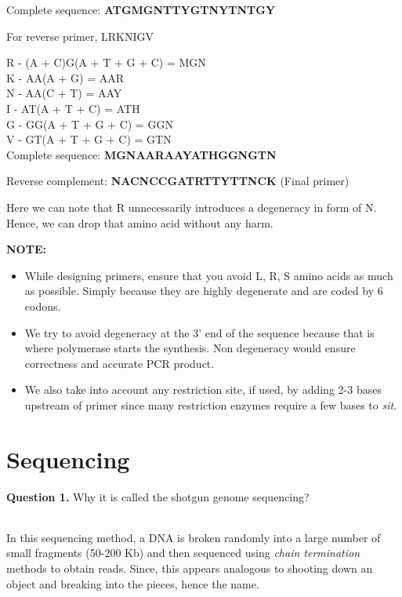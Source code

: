 \documentclass[12pt,a4paper]{report}
\begin{document}
\begin{enumerate}
Complete sequence: \textbf{ATGMGNTTYGTNYTNTGY}

For reverse primer, LRKNIGV

R - (A + C)G(A + T + G + C)  = MGN\\
K - AA(A + G)                = AAR\\
N - AA(C + T)                = AAY\\
I - AT(A + T + C)            = ATH\\
G - GG(A + T + G + C)        = GGN\\
V - GT(A + T + G + C)        = GTN\\

Complete sequence: \textbf{MGNAARAAYATHGGNGTN}

Reverse complement: \textbf{NACNCCGATRTTYTTNCK} (Final primer)

Here we can note that R unnecessarily introduces a degeneracy in form of N. 
Hence,
we can drop that amino acid without any harm.
\end{enumerate}

\textbf{NOTE:}
\begin{itemize}
\item While designing primers, ensure that you avoid L, R, S amino acids as 
much as
possible. Simply because they are highly degenerate and are coded by 6 codons.

\item We try to avoid degeneracy at the 3' end of the sequence because that is 
where
polymerase starts the synthesis. Non degeneracy would ensure correctness and
accurate PCR product.
\item We also take into account any restriction site, if used, by adding 2-3 
bases upstream of primer since many restriction enzymes require a few  bases to 
\textit{sit}.

\end{itemize}
\chapter*{Sequencing}
\textbf{Question 1.} Why it is called the shotgun genome sequencing?
\subparagraph{}
In this sequencing method, a DNA is broken randomly into a large number of 
small fragments (50-200 Kb) and then sequenced using \textit{chain termination} 
methods to obtain reads. Since, this appears analogous to shooting down an 
object and breaking into the pieces, hence the name.\mbox{}\\
\end{document}
